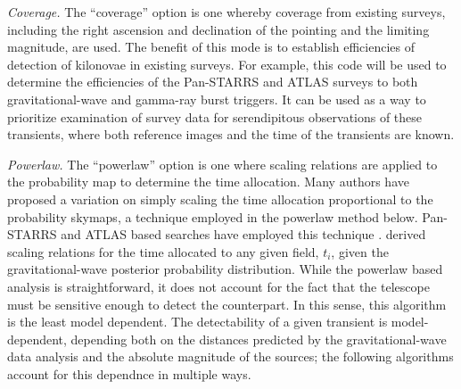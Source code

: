 \documentclass[twocolumn]{aastex62}
\begin{document}
\emph{Coverage.} The ``coverage'' option is one whereby coverage from existing surveys, including the right ascension and declination of the pointing and the limiting magnitude, are used. The benefit of this mode is to establish efficiencies of detection of kilonovae in existing surveys. For example, this code will be used to determine the efficiencies of the Pan-STARRS and ATLAS surveys to both gravitational-wave and gamma-ray burst triggers. It can be used as a way to prioritize examination of survey data for serendipitous observations of these transients, where both reference images and the time of the transients are known.

\emph{Powerlaw.} The ``powerlaw'' option is one where scaling relations are applied to the probability map to determine the time allocation.
Many authors \citep{GhBl2016,CoSt2016a,ChHu2017} have proposed a variation on simply scaling the time allocation proportional to the probability skymaps, a technique employed in the powerlaw method below.
Pan-STARRS and ATLAS based searches have employed this technique \citep{SmCh2016,SmCh2016b,StTo2017}.
\cite{CoSt2016a} derived scaling relations for the time allocated to any given field, $t_i$, given the gravitational-wave posterior probability distribution. While the powerlaw based analysis is straightforward, it does not account for the fact that the telescope must be sensitive enough to detect the counterpart. In this sense, this algorithm is the least model dependent. The detectability of a given transient is model-dependent, depending both on the distances predicted by the gravitational-wave data analysis and the absolute magnitude of the sources; the following algorithms account for this dependnce in multiple ways.
\end{document}
